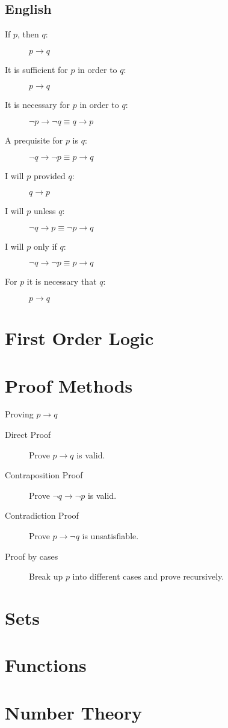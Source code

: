 \documentclass[a4paper]{article}
\begin{document}
\subsection{English}
\begin{description}
    \item[If $p$, then $q$:] $p \to q$
    \item[It is sufficient for $p$ in order to $q$:] $p \to q$
    \item[It is necessary for $p$ in order to $q$:] $\neg p \to \neg q \equiv q \to p$
    \item[A prequisite for $p$ is $q$:] $\neg q \to \neg p \equiv p \to q$
    \item[I will $p$ provided $q$:] $q \to p$
    \item[I will $p$ unless $q$:] $\neg q \to p \equiv \neg p \to q$
    \item[I will $p$ only if $q$:] $\neg q \to \neg p \equiv p \to q$
    \item[For $p$ it is necessary that $q$:] $p \to q$
\end{description}
\section{First Order Logic}

\section{Proof Methods}
Proving $p \to q$
\begin{description}
    \item[Direct Proof] Prove $p \to q$ is valid.
    \item[Contraposition Proof] Prove $\neg q \to \neg p$ is valid.
    \item[Contradiction Proof] Prove $p \to \neg q$ is unsatisfiable.
    \item[Proof by cases] Break up $p$ into different cases and prove recursively.
\end{description}

\section{Sets}

\section{Functions}

\section{Number Theory}
\end{document}
